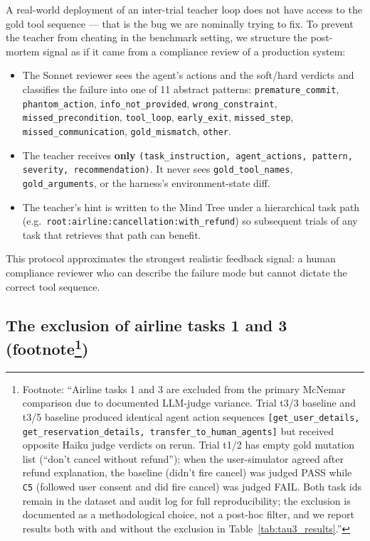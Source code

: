A real-world deployment of an inter-trial teacher loop does not have access to the gold tool sequence — that is the bug we are nominally trying to fix. To prevent the teacher from cheating in the benchmark setting, we structure the post-mortem signal as if it came from a compliance review of a production system:

\begin{itemize}[leftmargin=*]
\item The Sonnet reviewer sees the agent's actions and the soft/hard verdicts and classifies the failure into one of 11 abstract patterns: \texttt{premature\_commit}, \texttt{phantom\_action}, \texttt{info\_not\_provided}, \texttt{wrong\_constraint}, \texttt{missed\_precondition}, \texttt{tool\_loop}, \texttt{early\_exit}, \texttt{missed\_step}, \texttt{missed\_communication}, \texttt{gold\_mismatch}, \texttt{other}.
\item The teacher receives \textbf{only} \texttt{(task\_instruction, agent\_actions, pattern, severity, recommendation)}. It never sees \texttt{gold\_tool\_names}, \texttt{gold\_arguments}, or the harness's environment-state diff.
\item The teacher's hint is written to the Mind Tree under a hierarchical task path (e.g.\ \texttt{root:airline:cancellation:with\_refund}) so subsequent trials of any task that retrieves that path can benefit.
\end{itemize}

This protocol approximates the strongest realistic feedback signal: a human compliance reviewer who can describe the failure mode but cannot dictate the correct tool sequence.

\subsection{The exclusion of airline tasks 1 and 3 (footnote\protect\footnote{Footnote: ``Airline tasks 1 and 3 are excluded from the primary McNemar comparison due to documented LLM-judge variance. Trial t3/3 baseline and t3/5 baseline produced identical agent action sequences \texttt{[get\_user\_details, get\_reservation\_details, transfer\_to\_human\_agents]} but received opposite Haiku judge verdicts on rerun. Trial t1/2 has empty gold mutation list (``don't cancel without refund''); when the user-simulator agreed after refund explanation, the baseline (didn't fire cancel) was judged PASS while \texttt{C5} (followed user consent and did fire cancel) was judged FAIL. Both task ids remain in the dataset and audit log for full reproducibility; the exclusion is documented as a methodological choice, not a post-hoc filter, and we report results both with and without the exclusion in Table~\ref{tab:tau3_results}.''})}

